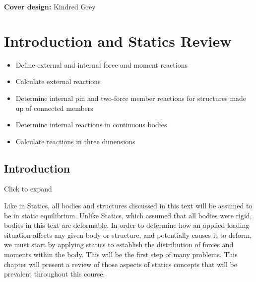 \documentclass[
  letterpaper,
  DIV=11,
  numbers=noendperiod]{scrreprt}
\providecommand{\tightlist}{%
  \setlength{\itemsep}{0pt}\setlength{\parskip}{0pt}}\usepackage{longtable,booktabs,array}
\begin{document}
\textbf{Cover design:} Kindred Grey


\chapter{Introduction and Statics Review}\label{sec-statics}

\begin{tcolorbox}[enhanced jigsaw, breakable, opacityback=0, toptitle=1mm, left=2mm, colback=white, opacitybacktitle=0.6, colframe=quarto-callout-note-color-frame, titlerule=0mm, arc=.35mm, leftrule=.75mm, bottomtitle=1mm, colbacktitle=quarto-callout-note-color!10!white, rightrule=.15mm, title={Learning Objectives}, bottomrule=.15mm, toprule=.15mm, coltitle=black]

\begin{itemize}
\tightlist
\item
  Define external and internal force and moment reactions
\item
  Calculate external reactions
\item
  Determine internal pin and two-force member reactions for structures
  made up of connected members
\item
  Determine internal reactions in continuous bodies
\item
  Calculate reactions in three dimensions
\end{itemize}

\end{tcolorbox}

\section*{Introduction}\label{introduction-1}


Click to expand

Like in Statics, all bodies and structures discussed in this text will
be assumed to be in static equilibrium. Unlike Statics, which assumed
that all bodies were rigid, bodies in this text are deformable. In order
to determine how an applied loading situation affects any given body or
structure, and potentially causes it to deform, we must start by
applying statics to establish the distribution of forces and moments
within the body. This will be the first step of many problems. This
chapter will present a review of those aspects of statics concepts that
will be prevalent throughout this course.
\end{document}
